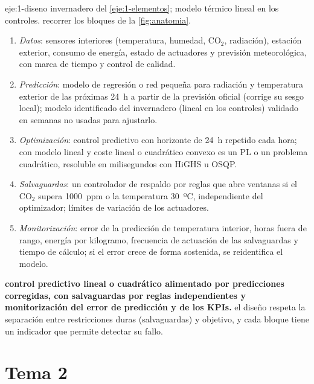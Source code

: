 \begin{solucion}{eje:1-diseno}
\datos invernadero del \cref{eje:1-elementos}; modelo térmico lineal en los controles.
\planteamiento recorrer los bloques de la \cref{fig:anatomia}.
\pasos
\begin{enumerate}[label=\arabic*.]
  \item \emph{Datos}: sensores interiores (temperatura, humedad, CO$_2$, radiación), estación exterior, consumo de energía, estado de actuadores y previsión meteorológica, con marca de tiempo y control de calidad.
  \item \emph{Predicción}: modelo de regresión o red pequeña para radiación y temperatura exterior de las próximas 24~h a partir de la previsión oficial (corrige su sesgo local); modelo identificado del invernadero (lineal en los controles) validado en semanas no usadas para ajustarlo.
  \item \emph{Optimización}: control predictivo con horizonte de 24~h repetido cada hora; con modelo lineal y coste lineal o cuadrático convexo es un PL o un problema cuadrático, resoluble en milisegundos con HiGHS u OSQP.
  \item \emph{Salvaguardas}: un controlador de respaldo por reglas que abre ventanas si el CO$_2$ supera 1000~ppm o la temperatura 30~ºC, independiente del optimizador; límites de variación de los actuadores.
  \item \emph{Monitorización}: error de la predicción de temperatura interior, horas fuera de rango, energía por kilogramo, frecuencia de actuación de las salvaguardas y tiempo de cálculo; si el error crece de forma sostenida, se reidentifica el modelo.
\end{enumerate}
\resultado \textbf{control predictivo lineal o cuadrático alimentado por predicciones corregidas, con salvaguardas por reglas independientes y monitorización del error de predicción y de los KPIs.}
\comprobacion el diseño respeta la separación entre restricciones duras (salvaguardas) y objetivo, y cada bloque tiene un indicador que permite detectar su fallo.
\end{solucion}

\section{Tema 2}

